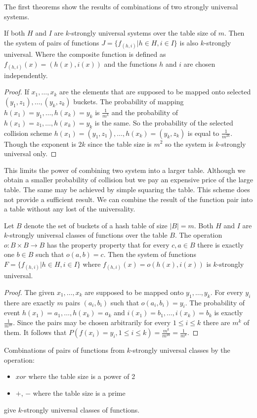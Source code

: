 The first theorems show the results of combinations of two strongly universal systems.
\begin{theorem}
If both $H$ and $I$ are $k$-strongly universal systems over the table size of $m$. Then the system of pairs of functions $J = \lbrace f_{(h, i)} | h \in H, i \in I \rbrace$ is also $k$-strongly universal. Where the composite function is defined as $f_{(h, i)}(x) = (h(x), i(x))$ and the functions $h$ and $i$ are chosen independently.
\end{theorem}
\begin{proof}
If $x_1, \dots, x_k$ are the elements that are supposed to be mapped onto selected $(y_1, z_1), \dots, (y_k, z_k)$ buckets. The probability of mapping $h(x_1) = y_1, \dots, h(x_k) = y_k$ is $\frac{1}{m^k}$ and the probability of $h(x_1) = z_1, \dots, h(x_k) = y_k$ is the same. So the probability of the selected collision scheme $h(x_1) = (y_1, z_1), \dots, h(x_k) = (y_k, z_k)$ is equal to $\frac{1}{m^{2k}}$. Though the exponent is $2k$ since the table size is $m^2$ so the system is $k$-strongly universal only.
\end{proof}

This limits the power of combining two system into a larger table. Although we obtain a smaller probability of collision but we pay an expensive price of the large table. The same may be achieved by simple squaring the table. This scheme does not provide a sufficient result. We can combine the result of the function pair into a table without any lost of the universality.
\begin{theorem}
Let $B$ denote the set of buckets of a hash table of size $|B| = m$. Both $H$ and $I$ are $k$-strongly universal classes of functions over the table $B$. The operation $o: B \times B \rightarrow B$ has the property property that for every $c, a \in B$ there is exactly one $b \in B$ such that $o(a, b) = c$. Then the system of functions $F = \lbrace f_{(h, i)} | h \in H, i \in I \rbrace$ where $f_{(h, i)}(x) = o(h(x), i(x))$ is $k$-strongly universal.
\end{theorem}
\begin{proof}
The given $x_1, \dots, x_k$ are supposed to be mapped onto $y_1, \dots, y_k$. For every $y_i$ there are exactly $m$ pairs $(a_i, b_i)$ such that $o(a_i, b_i) = y_i$. The probability of event $h(x_1) = a_1, \dots, h(x_k) = a_k$ and $i(x_1) = b_1, \dots, i(x_k) = b_k$ is exactly $\frac{1}{m^{2k}}$. Since the pairs may be chosen arbitrarily for every $1 \le i \le k$ there are $m^k$ of them. It follows that $P(f(x_i) = y_i, 1 \le i \le k) = \frac{m^k}{m^{2k}} = \frac{1}{m^k}$.
\end{proof}

\begin{corollary}
Combinations of pairs of functions from $k$-strongly universal classes by the operation:
\begin{itemize}
\item $xor$ where the table size is a power of 2
\item $+$, $-$ where the table size is a prime
\end{itemize}
give $k$-strongly universal classes of functions.
\end{corollary}

